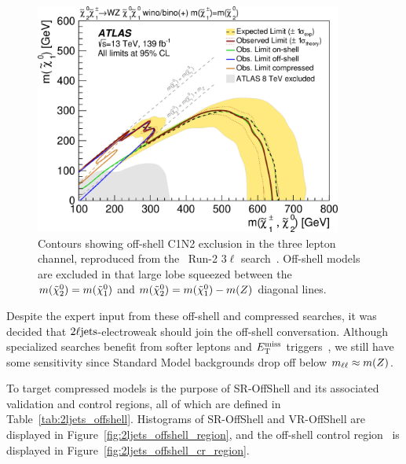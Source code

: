 \begin{figure}[tp]
\centering
\includegraphics[width=0.9\textwidth]{figures/2ljets_compressed_3l_ins1866951_fig_16a.png}
\caption[
Contours showing off-shell C1N2 exclusion from the \atlas\ Run-2 $3\ell$ search
]{%
Contours showing off-shell C1N2 exclusion in the three lepton channel,
reproduced from the \atlas\ Run-2 $3\ell$
search~\cite{atlas_rjr_3l_SUSY_2019_09, hepdata.95751}.
Off-shell models are excluded in that large lobe squeezed between the
$m(\tilde\chi^0_2) = m(\tilde\chi^0_1)$ and
$m(\tilde\chi^0_2) = m(\tilde\chi^0_1) - m(Z)$ diagonal lines.
}
\label{fig:ljets_offshell_3l_exclusion}
\end{figure}

Despite the expert input from these off-shell and compressed searches, it was
decided that $2\ell\mathrm{jets}$-electroweak should join the off-shell
conversation.
Although specialized searches benefit from softer leptons and $E_\mathrm{T}^\mathrm{miss}$
triggers~\cite{atlas_susy_compressed_2l_2018_run2},
we still have some sensitivity since Standard Model backgrounds drop off
below $m_{\ell\ell} \approx m(Z)$.

To target compressed models is the purpose of SR-OffShell and its associated
validation and control regions, all of which are defined in
Table~\ref{tab:2ljets_offshell}.
Histograms of SR-OffShell and VR-OffShell are displayed in
Figure~\ref{fig:2ljets_offshell_region}, and the off-shell control region
\crdy\ is displayed in Figure~\ref{fig:2ljets_offshell_cr_region}.

